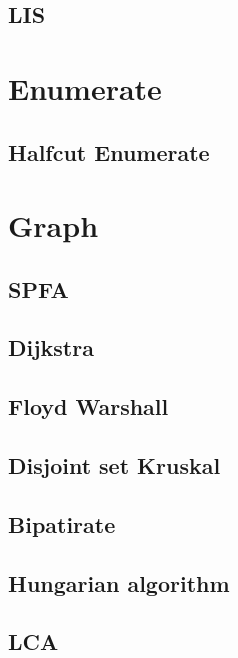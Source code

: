         \subsection{LIS}
                  

\section{Enumerate} 
        \subsection{Halfcut Enumerate}
                

\section{Graph}
        \subsection{SPFA}
                
        \subsection{Dijkstra}
                
        \subsection{Floyd Warshall}
                
        \subsection{Disjoint set Kruskal}
                
        \subsection{Bipatirate}
                
        \subsection{Hungarian algorithm}
                
        \subsection{LCA}
                

